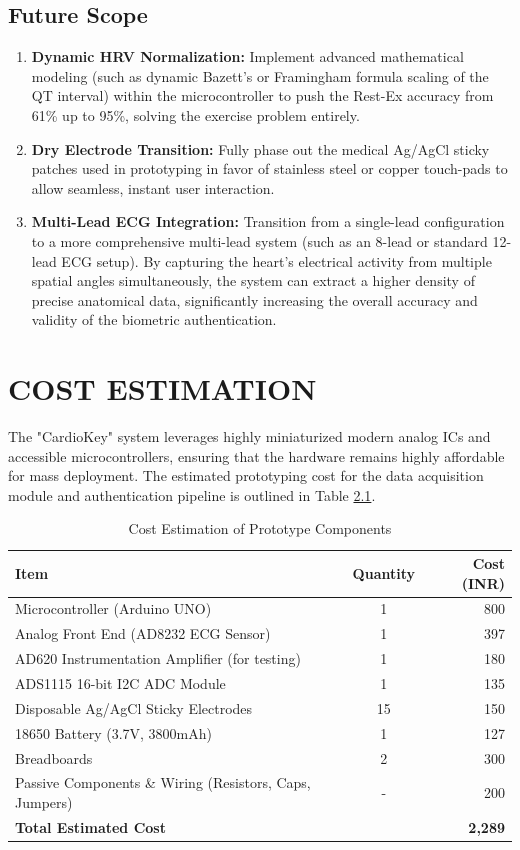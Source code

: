 \documentclass[12pt,a4paper]{report}
\begin{document}
\section{Future Scope}
\begin{enumerate}
\item \textbf{Dynamic HRV Normalization:} Implement advanced mathematical modeling (such as dynamic Bazett's or Framingham formula scaling of the QT interval) within the microcontroller to push the Rest-Ex accuracy from 61\% up to 95\%, solving the exercise problem entirely.
\item \textbf{Dry Electrode Transition:} Fully phase out the medical Ag/AgCl sticky patches used in prototyping in favor of stainless steel or copper touch-pads to allow seamless, instant user interaction.
\item \textbf{Multi-Lead ECG Integration:} Transition from a single-lead configuration to a more comprehensive multi-lead system (such as an 8-lead or standard 12-lead ECG setup). By capturing the heart's electrical activity from multiple spatial angles simultaneously, the system can extract a higher density of precise anatomical data, significantly increasing the overall accuracy and validity of the biometric authentication.
\end{enumerate}

\chapter{COST ESTIMATION}
The "CardioKey" system leverages highly miniaturized modern analog ICs and accessible microcontrollers, ensuring that the hardware remains highly affordable for mass deployment. The estimated prototyping cost for the data acquisition module and authentication pipeline is outlined in Table \ref{tab:cost_estimation}.

\begin{table}[h]
\centering
\caption{Cost Estimation of Prototype Components}
\vspace{0.3cm}
\begin{tabular}{l c r}
\hline
\textbf{Item} & \textbf{Quantity} & \textbf{Cost (INR)} \\
\hline
Microcontroller (Arduino UNO) & 1 & 800 \\
Analog Front End (AD8232 ECG Sensor) & 1 & 397 \\
AD620 Instrumentation Amplifier (for testing) & 1 & 180 \\
ADS1115 16-bit I2C ADC Module & 1 & 135 \\
Disposable Ag/AgCl Sticky Electrodes & 15 & 150 \\
18650 Battery (3.7V, 3800mAh) & 1 & 127 \\
Breadboards & 2 & 300 \\
Passive Components \& Wiring (Resistors, Caps, Jumpers) & - & 200 \\
\hline
\textbf{Total Estimated Cost} & & \textbf{2,289} \\
\hline
\end{tabular}
\label{tab:cost_estimation}
\end{table}
\end{document}
